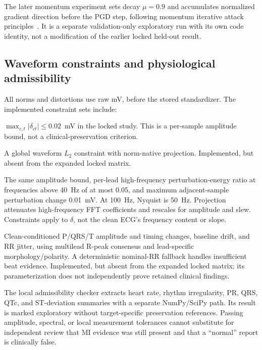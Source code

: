 The later momentum experiment sets decay $\mu=0.9$ and accumulates normalized gradient direction before the PGD step, following momentum iterative attack principles~\cite{momentum}. It is a separate validation-only exploratory run with its own code identity, not a modification of the earlier locked held-out result.

\subsection{Waveform constraints and physiological admissibility}
All norms and distortions use raw mV, before the stored standardizer. The implemented constraint sets include:
\begin{description}[leftmargin=18pt,style=nextline]
\item[$\mathcal S_\infty$.] $\max_{c,t}|\delta_{ct}|\leq0.02$~mV in the locked study. This is a per-sample amplitude bound, not a clinical-preservation criterion.
\item[$\mathcal S_2$.] A global waveform $L_2$ constraint with norm-native projection. Implemented, but absent from the expanded locked matrix.
\item[$\mathcal S_{\mathrm{spec}}$.] The same amplitude bound, per-lead high-frequency perturbation-energy ratio at frequencies above 40~Hz of at most 0.05, and maximum adjacent-sample perturbation change 0.01~mV. At 100~Hz, Nyquist is 50~Hz. Projection attenuates high-frequency FFT coefficients and rescales for amplitude and slew. Constraints apply to $\delta$, not the clean ECG's frequency content or slope.
\item[$\mathcal S_{\mathrm{phys}}$.] Clean-conditioned P/QRS/T amplitude and timing changes, baseline drift, and RR jitter, using multilead R-peak consensus and lead-specific morphology/polarity. A deterministic nominal-RR fallback handles insufficient beat evidence. Implemented, but absent from the expanded locked matrix; its parameterization does not independently prove retained clinical findings.
\end{description}

The local admissibility checker extracts heart rate, rhythm irregularity, PR, QRS, QTc, and ST-deviation summaries with a separate NumPy/SciPy path. Its result is marked exploratory without target-specific preservation references. Passing amplitude, spectral, or local measurement tolerances cannot substitute for independent review that MI evidence was still present and that a ``normal'' report is clinically false.

